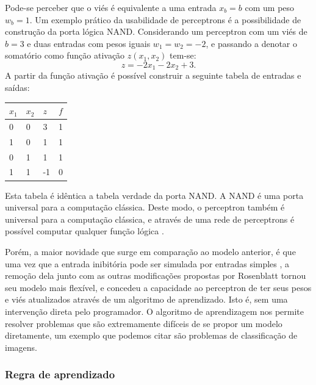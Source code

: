 Pode-se  perceber que o viés é equivalente a uma entrada $x_b=b$ com um peso $w_b=1$. Um exemplo prático da usabilidade de perceptrons é a possibilidade de construção da porta lógica NAND. Considerando um perceptron com um viés de $b=3$  e duas entradas com pesos iguais $w_1=w_2=-2$, e passando a denotar o somatório como função ativação $z\left(x_{1},x_{2}\right)$ tem-se:
\begin{equation}z=-2x_{1}-2x_{2}+3.\end{equation}
A partir da função ativação é possível construir a seguinte tabela de entradas e saídas:
\begin{center}
\begin{tabular}{|l|l|l|l|}
\hline
$x_1$ & $x_2$ & $z$ & $f$ \\ \hline
0     & 0     & 3   & 1                                             \\ \hline
1     & 0     & 1   & 1                                             \\ \hline
0     & 1     & 1   & 1                                             \\ \hline
1     & 1     & -1  & 0                                             \\ \hline
\end{tabular}
\end{center}
Esta tabela é idêntica a tabela verdade da porta NAND. A NAND é uma porta universal para a computação clássica. Deste modo, o perceptron também é universal para a computação clássica, e através de uma rede de perceptrons é possível computar qualquer função lógica \cite{nielsen2015neural}.

Porém, a maior novidade que surge em comparação ao modelo anterior, é que uma vez que a entrada inibitória pode ser simulada por entradas simples \cite{rojas}, a remoção dela junto com as outras modificações propostas por Rosenblatt tornou seu modelo mais flexível, e concedeu a capacidade ao perceptron de ter seus pesos e viés atualizados através de um algoritmo de aprendizado. Isto é, sem uma intervenção direta pelo programador. O algoritmo de aprendizagem nos permite resolver problemas que são extremamente difíceis de se propor um modelo diretamente, um exemplo que podemos citar são problemas de classificação de imagens.

\subsubsection{Regra de aprendizado}

